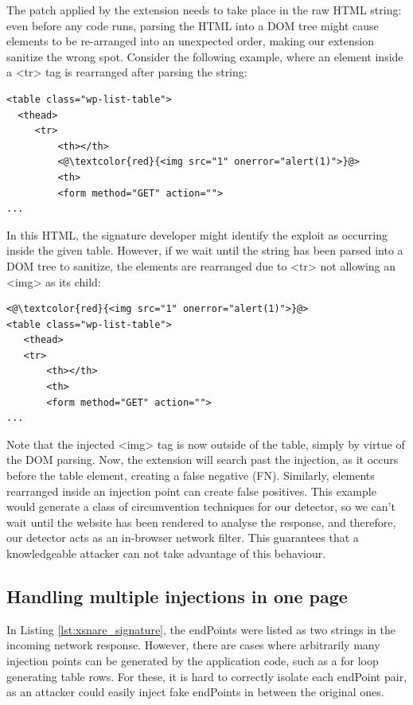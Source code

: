 The patch applied by the extension needs to take place in the raw HTML
string: even before any code runs, parsing the HTML into a DOM tree
might cause elements to be re-arranged into an unexpected order,
making our extension sanitize the wrong spot.  Consider the following
example, where an element inside a <tr> tag is rearranged after
parsing the string:

\begin{lstlisting}
<table class="wp-list-table">
  <thead>
     <tr>
	     <th></th>
	     <@\textcolor{red}{<img src="1" onerror="alert(1)">}@>
	     <th>
   	     <form method="GET" action="">
...
\end{lstlisting}

In this HTML, the signature developer might identify the exploit as
occurring inside the given table. However, if we wait until the string
has been parsed into a DOM tree to sanitize, the elements are
rearranged due to <tr> not allowing an <img> as its child:

\begin{lstlisting}
<@\textcolor{red}{<img src="1" onerror="alert(1)">}@>
<table class="wp-list-table">
   <thead>
   <tr>
	   <th></th>
	   <th>
       <form method="GET" action="">
...
\end{lstlisting}

Note that the injected <img> tag is now outside of the table, simply
by virtue of the DOM parsing. Now, the extension will search past the
injection, as it occurs before the table element, creating a false
negative (FN). Similarly, elements rearranged inside an injection
point can create false positives. This example would generate a class
of circumvention techniques for our detector, so we can't wait until
the website has been rendered to analyse the response, and therefore,
our detector acts as an in-browser network filter. This guarantees
that a knowledgeable attacker can not take advantage of this
behaviour.

\subsection{Handling multiple injections in one page} \label{multiple_injections}

In Listing \ref{lst:xsnare_signature}, the endPoints were listed as
two strings in the incoming network response. However, there are cases
where arbitrarily many injection points can be generated by the
application code, such as a for loop generating table rows. For these,
it is hard to correctly isolate each endPoint pair, as an attacker
could easily inject fake endPoints in between the original ones.

